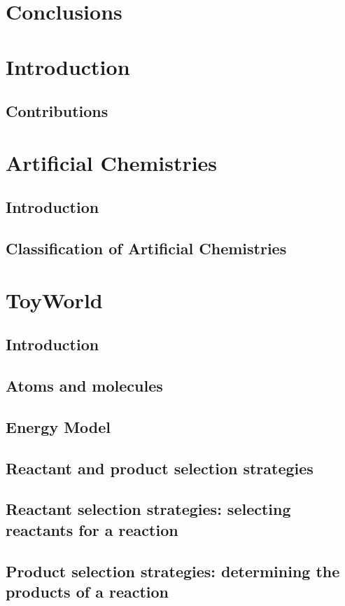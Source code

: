 \documentclass[]{report}
\begin{document}
\chapter{Conclusions}

\chapter{Introduction}
\section{Contributions}

\chapter{Artificial Chemistries}
\section{Introduction}
\section{Classification of Artificial Chemistries}

\chapter{ToyWorld}
\section{Introduction}
\section{Atoms and molecules}
\section{Energy Model}
\section{Reactant and product selection strategies}
\section{Reactant selection strategies: selecting reactants for a reaction}
\section{Product selection strategies: determining the products of a reaction}
\end{document}
